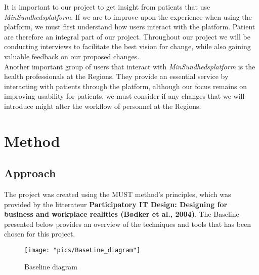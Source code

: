 \documentclass[a4paper,11pt]{article}
\begin{document}
It is important to our project to get insight from patients that use \textit{MinSundhedsplatform}. If we are to improve upon the experience when using the platform, we must first understand how users interact with the platform. Patient are therefore an integral part of our project. Throughout our project we will be conducting interviews to facilitate the best vision for change, while also gaining valuable feedback on our proposed changes.\\

Another important group of users that interact with \textit{MinSundhedsplatform} is the health professionals at the Regions. They provide an essential service by interacting with patients through the platform, although our focus remains on improving usability for patients, we must consider if any changes that we will introduce might alter the workflow of personnel at the Regions. 


\section{Method}
\subsection{Approach}
The project was created using the MUST method's principles, which was provided by the litterateur \textbf{Participatory IT Design: Designing for business and workplace realities (Bødker et al., 2004)}. The Baseline presented below provides an overview of the techniques and tools that has been chosen for this project.\\

\begin{figure}[H]
\centering
\hspace*{-1cm}
\texttt{[image: "pics/BaseLine\_diagram"]}
\label{fig:baseline}
\caption{Baseline diagram}
\end{figure}
\end{document}
